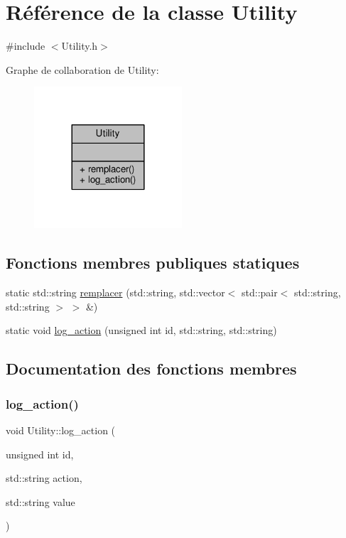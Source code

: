 \hypertarget{classUtility}{}\section{Référence de la classe Utility}
\label{classUtility}


{\ttfamily \#include $<$Utility.\+h$>$}



Graphe de collaboration de Utility\+:
\nopagebreak
\begin{figure}[H]
\begin{center}
\leavevmode
\includegraphics[width=156pt]{classUtility__coll__graph}
\end{center}
\end{figure}
\subsection*{Fonctions membres publiques statiques}
\begin{DoxyCompactItemize}
\item 
static std\+::string \hyperlink{classUtility_a954a0d1bb807e5aa0c3d7c7d1059c5fb}{remplacer} (std\+::string, std\+::vector$<$ std\+::pair$<$ std\+::string, std\+::string $>$ $>$ \&)
\item 
static void \hyperlink{classUtility_ad60c39b61fe45ce689004b818c4b6e2b}{log\+\_\+action} (unsigned int id, std\+::string, std\+::string)
\end{DoxyCompactItemize}


\subsection{Documentation des fonctions membres}
\mbox{\label{classUtility_ad60c39b61fe45ce689004b818c4b6e2b}} 
\subsubsection{\texorpdfstring{log\+\_\+action()}{log\_action()}}
{\footnotesize\ttfamily void Utility\+::log\+\_\+action (\begin{DoxyParamCaption}\item[{unsigned int}]{id,  }\item[{std\+::string}]{action,  }\item[{std\+::string}]{value }\end{DoxyParamCaption})\hspace{0.3cm}{\ttfamily [static]}}

